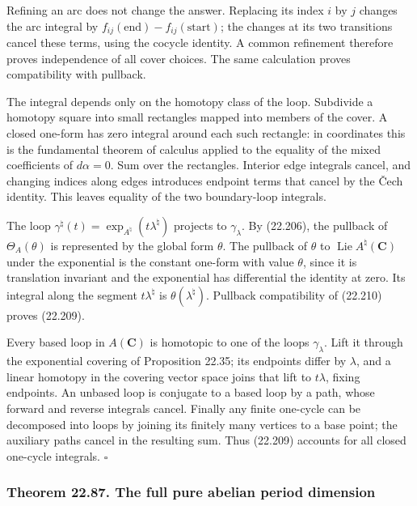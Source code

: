 \documentclass[
  11pt,
  a4paper,
]{article}
\begin{document}
Refining an arc does not change the answer. Replacing its index \(i\) by
\(j\) changes the arc integral by
\(f_{ij}(\mathrm{end})-f_{ij}(\mathrm{start})\); the changes at its two
transitions cancel these terms, using the cocycle identity. A common
refinement therefore proves independence of all cover choices. The same
calculation proves compatibility with pullback.

The integral depends only on the homotopy class of the loop. Subdivide a
homotopy square into small rectangles mapped into members of the cover.
A closed one-form has zero integral around each such rectangle: in
coordinates this is the fundamental theorem of calculus applied to the
equality of the mixed coefficients of \(d\alpha=0\). Sum over the
rectangles. Interior edge integrals cancel, and changing indices along
edges introduces endpoint terms that cancel by the Čech identity. This
leaves equality of the two boundary-loop integrals.

The loop \(\gamma^\natural(t)=\exp_{A^\natural}(t\lambda^\natural)\)
projects to \(\gamma_\lambda\). By (22.206), the pullback of
\(\Theta_A(\theta)\) is represented by the global form \(\theta\). The
pullback of \(\theta\) to \(\operatorname{Lie}A^\natural(\mathbf C)\)
under the exponential is the constant one-form with value \(\theta\),
since it is translation invariant and the exponential has differential
the identity at zero. Its integral along the segment
\(t\lambda^\natural\) is \(\theta(\lambda^\natural)\). Pullback
compatibility of (22.210) proves (22.209).

Every based loop in \(A(\mathbf C)\) is homotopic to one of the loops
\(\gamma_\lambda\). Lift it through the exponential covering of
Proposition 22.35; its endpoints differ by \(\lambda\), and a linear
homotopy in the covering vector space joins that lift to \(t\lambda\),
fixing endpoints. An unbased loop is conjugate to a based loop by a
path, whose forward and reverse integrals cancel. Finally any finite
one-cycle can be decomposed into loops by joining its finitely many
vertices to a base point; the auxiliary paths cancel in the resulting
sum. Thus (22.209) accounts for all closed one-cycle integrals.
\(\square\)

\subsubsection{Theorem 22.87. The full pure abelian period
dimension}\label{theorem-22.87.-the-full-pure-abelian-period-dimension}
\end{document}

